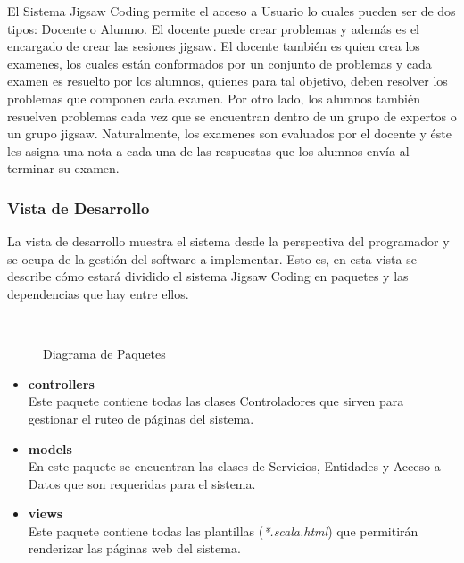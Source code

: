 El Sistema Jigsaw Coding permite el acceso a Usuario lo cuales pueden ser de dos tipos: Docente o Alumno. El docente puede crear problemas y además es el encargado de crear las sesiones jigsaw. El docente también es quien crea los examenes, los cuales están conformados por un conjunto de problemas y cada examen es resuelto por los alumnos, quienes para tal objetivo, deben resolver los problemas que componen cada examen. Por otro lado, los alumnos también resuelven problemas cada vez que se encuentran dentro de un grupo de expertos o un grupo jigsaw. Naturalmente, los examenes son evaluados por el docente y éste les asigna una nota a cada una de las respuestas que los alumnos envía al terminar su examen.

\subsubsection{Vista de Desarrollo}
La vista de desarrollo muestra el sistema desde la perspectiva del programador y se ocupa de la gestión del software a implementar. Esto es, en esta vista se describe cómo estará dividido el sistema Jigsaw Coding en paquetes y las dependencias que hay entre ellos.
\begin{figure}[!h]
	\centering
	\\
	\caption{Diagrama de Paquetes}\label{fig:c4_diagrama_de_paquetes}
\end{figure}
\begin{itemize}
	\item \textbf{controllers}\\Este paquete contiene todas las clases Controladores que sirven para gestionar el ruteo de páginas del sistema.
	\item \textbf{models}\\En este paquete se encuentran las clases de Servicios, Entidades y Acceso a Datos que son requeridas para el sistema.
	\item \textbf{views}\\Este paquete contiene todas las plantillas (\emph{*.scala.html}) que permitirán renderizar las páginas web del sistema.
\end{itemize}

